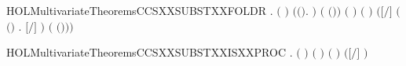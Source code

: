 \newcommand{\HOLMultivariateTheoremsCCSXXSUBSTXXFEMPTY}{\UseVerbatim{HOLMultivariateTheoremsCCSXXSUBSTXXFEMPTY}}
\begin{SaveVerbatim}{HOLMultivariateTheoremsCCSXXSUBSTXXFOLDR}
\HOLTokenTurnstile{} \HOLSymConst{\HOLTokenForall{}}  .
         \HOLSymConst{\HOLTokenConj{}} \ensuremath{(}  \HOLSymConst{\ensuremath{=}}  \ensuremath{)} \HOLSymConst{\HOLTokenConj{}}
        \ensuremath{(}\HOLTokenLambda{}\ensuremath{(}\HOLSymConst{,}\ensuremath{)}.   \HOLConst{\HOLTokenSubset{}} \HOLTokenLeftbrace{}\HOLTokenRightbrace{}\ensuremath{)} \ensuremath{(} \ensuremath{(}\HOLSymConst{,}\ensuremath{)}\ensuremath{)} \HOLSymConst{\HOLTokenConj{}}
        \ensuremath{(} \ensuremath{)} \ensuremath{(} \ensuremath{)} \HOLSymConst{\HOLTokenImp{}}
       \ensuremath{(}\ensuremath{[}\ensuremath{/}\ensuremath{]}  \HOLSymConst{\ensuremath{=}}  \ensuremath{(}\HOLTokenLambda{}\ensuremath{(}\HOLSymConst{,}\ensuremath{)} . \ensuremath{[}\ensuremath{/}\ensuremath{]} \ensuremath{)}  \ensuremath{(} \ensuremath{(}\HOLSymConst{,}\ensuremath{)}\ensuremath{)}\ensuremath{)}
\end{SaveVerbatim}
\newcommand{\HOLMultivariateTheoremsCCSXXSUBSTXXFOLDR}{\UseVerbatim{HOLMultivariateTheoremsCCSXXSUBSTXXFOLDR}}
\begin{SaveVerbatim}{HOLMultivariateTheoremsCCSXXSUBSTXXISXXPROC}
\HOLTokenTurnstile{} \HOLSymConst{\HOLTokenForall{}}  .
         \HOLSymConst{\HOLTokenConj{}} \ensuremath{(}  \HOLSymConst{\ensuremath{=}}  \ensuremath{)} \HOLSymConst{\HOLTokenConj{}}   \HOLSymConst{\HOLTokenConj{}}
         \HOLConst{\HOLTokenSubset{}}   \HOLSymConst{\HOLTokenConj{}}  \ensuremath{(} \ensuremath{)} \ensuremath{(} \ensuremath{)} \HOLSymConst{\HOLTokenImp{}}
        \ensuremath{(}\ensuremath{[}\ensuremath{/}\ensuremath{]} \ensuremath{)}
\end{SaveVerbatim}

